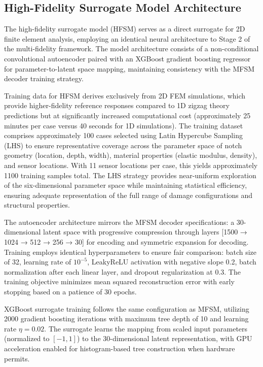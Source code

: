 \documentclass[12pt,a4paper]{report}
\begin{document}
\subsection{High-Fidelity Surrogate Model Architecture}

The high-fidelity surrogate model (HFSM) serves as a direct surrogate for 2D finite element analysis, employing an identical neural architecture to Stage 2 of the multi-fidelity framework. The model architecture consists of a non-conditional convolutional autoencoder paired with an XGBoost gradient boosting regressor for parameter-to-latent space mapping, maintaining consistency with the MFSM decoder training strategy.

Training data for HFSM derives exclusively from 2D FEM simulations, which provide higher-fidelity reference responses compared to 1D zigzag theory predictions but at significantly increased computational cost (approximately 25 minutes per case versus 40 seconds for 1D simulations). The training dataset comprises approximately 100 cases selected using Latin Hypercube Sampling (LHS) to ensure representative coverage across the parameter space of notch geometry (location, depth, width), material properties (elastic modulus, density), and sensor locations. With 11 sensor locations per case, this yields approximately 1100 training samples total. The LHS strategy provides near-uniform exploration of the six-dimensional parameter space while maintaining statistical efficiency, ensuring adequate representation of the full range of damage configurations and structural properties.

The autoencoder architecture mirrors the MFSM decoder specifications: a 30-dimensional latent space with progressive compression through layers [1500 → 1024 → 512 → 256 → 30] for encoding and symmetric expansion for decoding. Training employs identical hyperparameters to ensure fair comparison: batch size of 32, learning rate of $10^{-5}$, LeakyReLU activation with negative slope 0.2, batch normalization after each linear layer, and dropout regularization at 0.3. The training objective minimizes mean squared reconstruction error with early stopping based on a patience of 30 epochs.

XGBoost surrogate training follows the same configuration as MFSM, utilizing 2000 gradient boosting iterations with maximum tree depth of 10 and learning rate $\eta = 0.02$. The surrogate learns the mapping from scaled input parameters (normalized to $[-1, 1]$) to the 30-dimensional latent representation, with GPU acceleration enabled for histogram-based tree construction when hardware permits.
\end{document}
